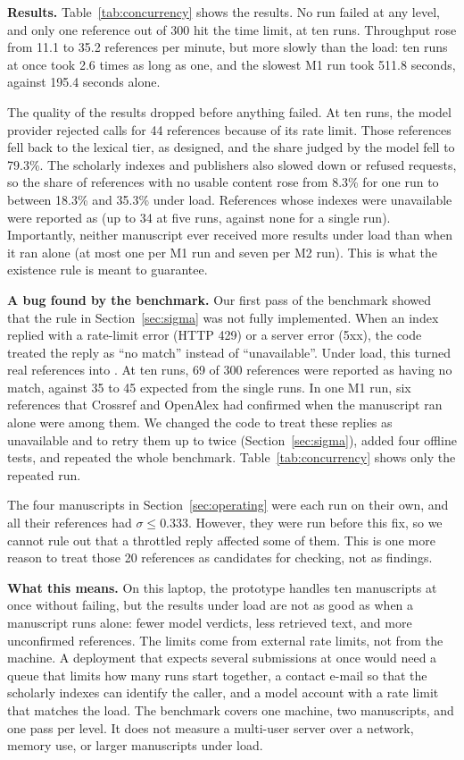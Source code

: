 \documentclass{article}
\newcommand{\vd}[1]{\texttt{\detokenize{#1}}}
\begin{document}
\textbf{Results.} Table~\ref{tab:concurrency} shows the results. No run failed at any level, and only one reference out of 300 hit the time limit, at ten runs. Throughput rose from 11.1 to 35.2 references per minute, but more slowly than the load: ten runs at once took 2.6 times as long as one, and the slowest M1 run took 511.8 seconds, against 195.4 seconds alone.

The quality of the results dropped before anything failed. At ten runs, the model provider rejected calls for 44 references because of its rate limit. Those references fell back to the lexical tier, as designed, and the share judged by the model fell to 79.3\%. The scholarly indexes and publishers also slowed down or refused requests, so the share of references with no usable content rose from 8.3\% for one run to between 18.3\% and 35.3\% under load. References whose indexes were unavailable were reported as \vd{unconfirmed} (up to 34 at five runs, against none for a single run). Importantly, neither manuscript ever received more \vd{not_found} results under load than when it ran alone (at most one per M1 run and seven per M2 run). This is what the existence rule is meant to guarantee.

\textbf{A bug found by the benchmark.} Our first pass of the benchmark showed that the rule in Section~\ref{sec:sigma} was not fully implemented. When an index replied with a rate-limit error (HTTP 429) or a server error (5xx), the code treated the reply as ``no match'' instead of ``unavailable''. Under load, this turned real references into \vd{not_found}. At ten runs, 69 of 300 references were reported as having no match, against 35 to 45 expected from the single runs. In one M1 run, six references that Crossref and OpenAlex had confirmed when the manuscript ran alone were among them. We changed the code to treat these replies as unavailable and to retry them up to twice (Section~\ref{sec:sigma}), added four offline tests, and repeated the whole benchmark. Table~\ref{tab:concurrency} shows only the repeated run.

The four manuscripts in Section~\ref{sec:operating} were each run on their own, and all their \vd{not_found} references had $\sigma \le 0.333$. However, they were run before this fix, so we cannot rule out that a throttled reply affected some of them. This is one more reason to treat those 20 references as candidates for checking, not as findings.

\textbf{What this means.} On this laptop, the prototype handles ten manuscripts at once without failing, but the results under load are not as good as when a manuscript runs alone: fewer model verdicts, less retrieved text, and more unconfirmed references. The limits come from external rate limits, not from the machine. A deployment that expects several submissions at once would need a queue that limits how many runs start together, a contact e-mail so that the scholarly indexes can identify the caller, and a model account with a rate limit that matches the load. The benchmark covers one machine, two manuscripts, and one pass per level. It does not measure a multi-user server over a network, memory use, or larger manuscripts under load.
\end{document}
